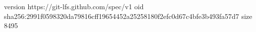 version https://git-lfs.github.com/spec/v1
oid sha256:2991f0598320da79816cff19654452a25258180f2efc0d67c4bfe3b493fa57d7
size 8495
